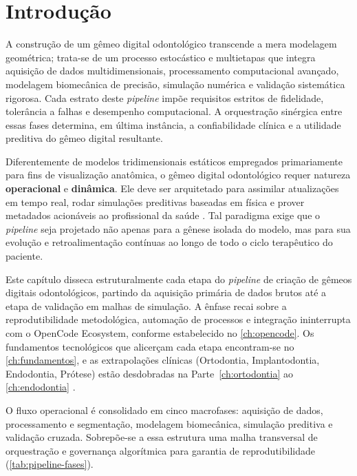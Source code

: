 \section{Introdução}
\label{sec:pipeline-intro}

A construção de um gêmeo digital odontológico transcende a mera modelagem geométrica; trata-se de um processo estocástico e multietapas que integra aquisição de dados multidimensionais, processamento computacional avançado, modelagem biomecânica de precisão, simulação numérica e validação sistemática rigorosa. Cada estrato deste \textit{pipeline} impõe requisitos estritos de fidelidade, tolerância a falhas e desempenho computacional. A orquestração sinérgica entre essas fases determina, em última instância, a confiabilidade clínica e a utilidade preditiva do gêmeo digital resultante.

Diferentemente de modelos tridimensionais estáticos empregados primariamente para fins de visualização anatômica, o gêmeo digital odontológico requer natureza \textbf{operacional} e \textbf{dinâmica}. Ele deve ser arquitetado para assimilar atualizações em tempo real, rodar simulações preditivas baseadas em física e prover metadados acionáveis ao profissional da saúde \cite{katsoulakis2024digital}. Tal paradigma exige que o \textit{pipeline} seja projetado não apenas para a gênese isolada do modelo, mas para sua evolução e retroalimentação contínuas ao longo de todo o ciclo terapêutico do paciente.


Este capítulo disseca estruturalmente cada etapa do \textit{pipeline} de criação de gêmeos digitais odontológicos, partindo da aquisição primária de dados brutos até a etapa de validação em malhas de simulação. A ênfase recai sobre a reprodutibilidade metodológica, automação de processos e integração ininterrupta com o OpenCode Ecosystem, conforme estabelecido no \autoref{ch:opencode}. Os fundamentos tecnológicos que alicerçam cada etapa encontram-se no \autoref{ch:fundamentos}, e as extrapolações clínicas (Ortodontia, Implantodontia, Endodontia, Prótese) estão desdobradas na Parte~\ref{ch:ortodontia} ao \autoref{ch:endodontia} \cite{duggal2026exploring}.

O fluxo operacional é consolidado em cinco macrofases: aquisição de dados, processamento e segmentação, modelagem biomecânica, simulação preditiva e validação cruzada. Sobrepõe-se a essa estrutura uma malha transversal de orquestração e governança algorítmica para garantia de reprodutibilidade (\autoref{tab:pipeline-fases}).

